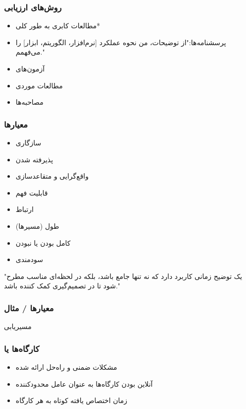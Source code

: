 \documentclass[10pt, a4paper]{beamer}
\begin{document}
\begin{frame}
    \frametitle{روش‌های ارزیابی}

    \begin{itemize}
        \item مطالعات کابری به طور کلی*
        \item پرسشنامه‌ها:"از توضیحات، من نحوه عملکرد [نرم‌افزار، الگوریتم،
        ابزار] را می‌فهمم." 
        \item آزمون‌های 
        \item مطالعات موردی
        \item مصاحبه‌ها
    \end{itemize}
\end{frame}

\begin{frame}
    \frametitle{معیار‌ها}

    \begin{itemize}
        \item سازگاری
        \item پذیرفته شدن
        \item واقع‌گرایی و متقاعد‌سازی
        \item قابلیت فهم
        \item ارتباط
        \item طول (مسیر‌ها)
        \item کامل بودن یا نبودن
        \item سودمندی
    \end{itemize}

    \centering
    "یک توضیح زمانی کاربرد دارد که نه تنها جامع باشد، بلکه در لحظه‌ای مناسب مطرح
    شود تا در تصمیم‌گیری کمک کننده باشد."
\end{frame}

\begin{frame}
    \frametitle{معیار‌ها / مثال}

    \centering
    مسیریابی
\end{frame}

\begin{frame}
    \frametitle{کارگاه‌ها یا }

    \begin{itemize}
        \item مشکلات ضمنی و راه‌حل ارائه شده
        \item آنلاین بودن کارگاه‌ها به عنوان عامل محدود‌کننده
        \item زمان اختصاص یافته کوتاه به هر کارگاه
    \end{itemize}
\end{frame}
\end{document}
